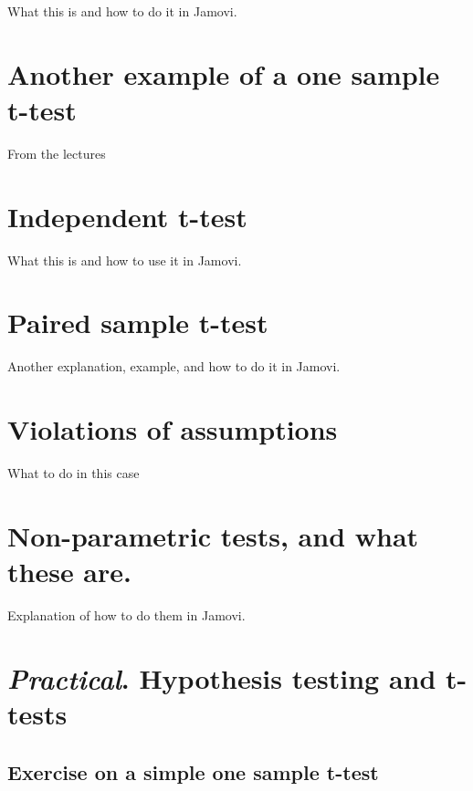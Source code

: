 \documentclass[
]{scrbook}
\begin{document}
What this is and how to do it in Jamovi.

\hypertarget{another-example-of-a-one-sample-t-test}{%
\chapter{Another example of a one sample t-test}\label{another-example-of-a-one-sample-t-test}}

From the lectures

\hypertarget{independent-t-test}{%
\chapter{Independent t-test}\label{independent-t-test}}

What this is and how to use it in Jamovi.

\hypertarget{paired-sample-t-test}{%
\chapter{Paired sample t-test}\label{paired-sample-t-test}}

Another explanation, example, and how to do it in Jamovi.

\hypertarget{violations-of-assumptions}{%
\chapter{Violations of assumptions}\label{violations-of-assumptions}}

What to do in this case

\hypertarget{non-parametric-tests-and-what-these-are.}{%
\chapter{Non-parametric tests, and what these are.}\label{non-parametric-tests-and-what-these-are.}}

Explanation of how to do them in Jamovi.

\hypertarget{practical.-hypothesis-testing-and-t-tests}{%
\chapter{\texorpdfstring{\emph{Practical}. Hypothesis testing and t-tests}{Practical. Hypothesis testing and t-tests}}\label{practical.-hypothesis-testing-and-t-tests}}

\hypertarget{exercise-on-a-simple-one-sample-t-test}{%
\section{Exercise on a simple one sample t-test}\label{exercise-on-a-simple-one-sample-t-test}}
\end{document}
